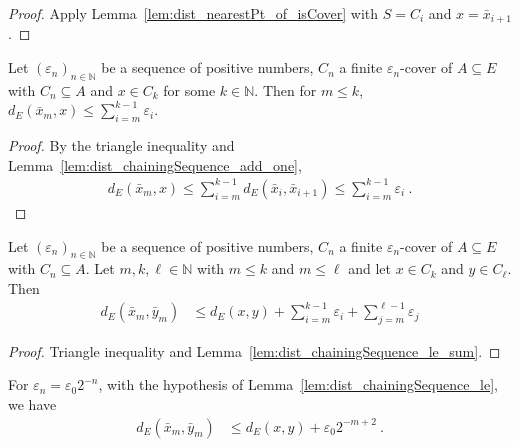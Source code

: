 \begin{proof}\leanok
Apply Lemma~\ref{lem:dist_nearestPt_of_isCover} with $S = C_i$ and $x = \bar{x}_{i+1}$.
\end{proof}


\begin{lemma}\label{lem:dist_chainingSequence_le_sum}
  \leanok
Let $(\varepsilon_n)_{n \in \mathbb{N}}$ be a sequence of positive numbers, $C_n$ a finite $\varepsilon_n$-cover of $A \subseteq E$ with $C_n \subseteq A$ and $x \in C_k$ for some $k \in \mathbb{N}$.
Then for $m \le k$, $d_E(\bar{x}_m, x) \le \sum_{i=m}^{k-1} \varepsilon_i$.
\end{lemma}

\begin{proof}\leanok
By the triangle inequality and Lemma~\ref{lem:dist_chainingSequence_add_one},
\begin{align*}
  d_E(\bar{x}_m, x)
  \le \sum_{i=m}^{k-1} d_E(\bar{x}_i, \bar{x}_{i+1})
  \le \sum_{i=m}^{k-1} \varepsilon_i
  \: .
\end{align*}
\end{proof}


\begin{lemma}\label{lem:dist_chainingSequence_le}
  \leanok
Let $(\varepsilon_n)_{n \in \mathbb{N}}$ be a sequence of positive numbers, $C_n$ a finite $\varepsilon_n$-cover of $A \subseteq E$ with $C_n \subseteq A$.
Let $m, k, \ell \in \mathbb{N}$ with $m \le k$ and $m \le \ell$ and let $x \in C_k$ and $y \in C_\ell$.
Then
\begin{align*}
  d_E(\bar{x}_m, \bar{y}_m)
  &\le d_E(x, y) + \sum_{i=m}^{k-1} \varepsilon_i + \sum_{j=m}^{\ell-1} \varepsilon_j
\end{align*}
\end{lemma}

\begin{proof}\leanok
Triangle inequality and Lemma~\ref{lem:dist_chainingSequence_le_sum}.
\end{proof}


\begin{corollary}\label{cor:dist_chainingSequence_pow_two_le}
  \leanok
For $\varepsilon_n = \varepsilon_0 2^{-n}$, with the hypothesis of Lemma~\ref{lem:dist_chainingSequence_le}, we have
\begin{align*}
  d_E(\bar{x}_m, \bar{y}_m)
  &\le d_E(x, y) + \varepsilon_0 2^{-m+2}
  \: .
\end{align*}
\end{corollary}


